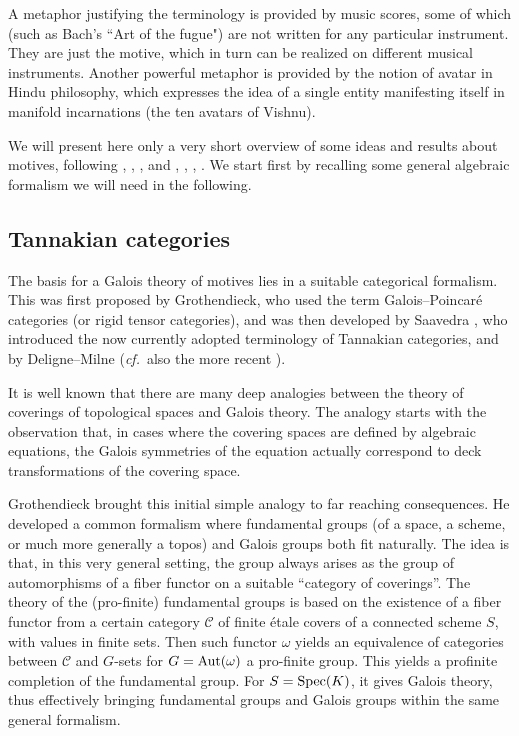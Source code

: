\documentclass[10pt]{amsart}
\def\sC{{\mathcal C}}
\def\Aut{\mathop{\rm Aut}\nolimits}
\def\Spec{{\rm Spec}}
\newcommand{\cf}{{\it cf.\/}\ }
\numberwithin{equation}{section}
\begin{document}
\smallskip

A metaphor \cite{Gro3} justifying the terminology is provided by
music scores, some of which (such as Bach's ``Art of the fugue")
are not written for any particular instrument. They are just the motive,
which in turn can be realized on different musical instruments.
Another powerful metaphor is provided by the notion of avatar in Hindu
philosophy, which expresses the idea of a single
entity manifesting itself in manifold incarnations (the ten
avatars of Vishnu).

\smallskip

We will present here only a very short overview of some ideas and results about
motives, following \cite{De3}, \cite{Man2}, \cite{Se1}, and \cite{Blo},
\cite{dg}, \cite{Gon}, \cite{Le}.
We start first by recalling some general algebraic formalism we will
need in the following.


\medskip
\subsection*{Tannakian categories}\hfill\medskip

The basis for a Galois theory of motives lies in a suitable
categorical formalism. This was first proposed by Grothendieck, who
used the term Galois--Poincar\'e categories (or rigid tensor
categories), and was then developed by Saavedra \cite{Saa}, who
introduced the now currently adopted terminology of Tannakian
categories, and by Deligne--Milne \cite{DeMi} (\cf also the more
recent \cite{De2}).

\smallskip

It is well known that there are many deep analogies between the theory
of coverings of topological spaces and Galois theory. The analogy
starts with the observation that, in cases where
the covering spaces are defined by algebraic equations, the Galois
symmetries of the equation actually correspond to deck transformations of
the covering space.

\smallskip

Grothendieck brought this initial simple analogy to far reaching
consequences. He developed a common formalism where fundamental
groups (of a space, a scheme, or much more generally a topos) and
Galois groups both fit naturally. The idea is that, in this very
general setting, the group always arises as the group of
automorphisms of a fiber functor on a suitable ``category of
coverings''. The theory of the (pro-finite) fundamental groups is
based on the existence of a fiber functor from a certain category
$\sC$ of finite \'etale covers of a connected scheme $S$, with
values in finite sets. Then such functor $\omega$ yields an
equivalence of categories between $\sC$ and $G$-sets for
$G=\Aut(\omega)$ a pro-finite group. This yields a profinite
completion of the fundamental group. For $S=\Spec(K)$, it gives
Galois theory, thus effectively bringing fundamental groups and
Galois groups within the same general formalism.
\end{document}
